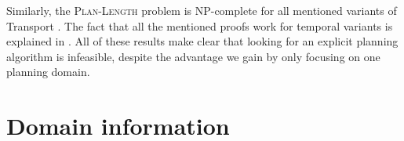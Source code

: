 Similarly, the \textsc{Plan-Length} problem is NP-complete for all mentioned variants of Transport
\citep[Section~3.6]{Helmert2001a}.
The fact that all the mentioned proofs work for temporal variants is explained in \citet[Section~3.5]{Helmert2001a}.
All of these results make clear that looking for an explicit planning algorithm is infeasible,
despite the advantage we gain by only focusing on one planning domain.












\section{Domain information}\label{domain-info}

